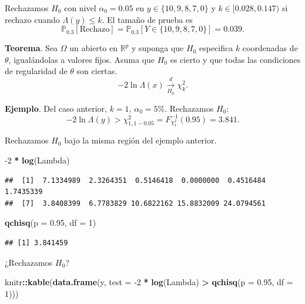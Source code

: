 \documentclass[
  12pt,
]{book}
\newenvironment{Shaded}{\begin{snugshade}}{\end{snugshade}}
\newcommand{\DataTypeTok}[1]{\textcolor[rgb]{0.13,0.29,0.53}{#1}}
\newcommand{\DecValTok}[1]{\textcolor[rgb]{0.00,0.00,0.81}{#1}}
\newcommand{\FloatTok}[1]{\textcolor[rgb]{0.00,0.00,0.81}{#1}}
\newcommand{\KeywordTok}[1]{\textcolor[rgb]{0.13,0.29,0.53}{\textbf{#1}}}
\newcommand{\NormalTok}[1]{#1}
\newcommand{\OperatorTok}[1]{\textcolor[rgb]{0.81,0.36,0.00}{\textbf{#1}}}
\newcommand{\StringTok}[1]{\textcolor[rgb]{0.31,0.60,0.02}{#1}}
\begin{document}
Rechazamos \(H_0\) con nivel \(\alpha_0 = 0.05\) en \(y \in\{10,9,8,7,0\}\) y \(k\in [0.028,0.147)\) si rechazo cuando \(\Lambda(y)\leq k\). El tamaño de prueba es
\[\mathbb P_{0.3}[\text{Rechazo}] = \mathbb{P}_{0.3}[Y\in \{10,9,8,7,0\}] = 0.039.\]

\textbf{Teorema}. Sea \(\Omega\) un abierto en \(\mathbb R^p\) y suponga que \(H_0\) especifica \(k\) coordenadas de \(\theta\), igualándolas a valores fijos. Asuma que \(H_0\) es cierto y que todas las condiciones de regularidad de \(\theta\) son ciertas.
\[-2\ln\Lambda(x)\xrightarrow[H_0]{d}\chi^2_k.\]

\textbf{Ejemplo}. Del caso anterior, \(k=1\), \(\alpha_0 = 5\%\). Rechazamos \(H_0\):
\[-2\ln \Lambda(y)>\chi^2_{1,1-0.05} = F^{-1}_{\chi^2_1}(0.95) = 3.841.\]

Rechazamos \(H_0\) bajo la misma región del ejemplo anterior.

\begin{Shaded}
\begin{Highlighting}[]
\DecValTok{{-}2} \OperatorTok{*}\StringTok{ }\KeywordTok{log}\NormalTok{(Lambda)}
\end{Highlighting}
\end{Shaded}

\begin{verbatim}
##  [1]  7.1334989  2.3264351  0.5146418  0.0000000  0.4516484  1.7435339
##  [7]  3.8408399  6.7783829 10.6822162 15.8832009 24.0794561
\end{verbatim}

\begin{Shaded}
\begin{Highlighting}[]
\KeywordTok{qchisq}\NormalTok{(}\DataTypeTok{p =} \FloatTok{0.95}\NormalTok{, }\DataTypeTok{df =} \DecValTok{1}\NormalTok{)}
\end{Highlighting}
\end{Shaded}

\begin{verbatim}
## [1] 3.841459
\end{verbatim}

¿Rechazamos \(H_0\)?

\begin{Shaded}
\begin{Highlighting}[]
\NormalTok{knitr}\OperatorTok{::}\KeywordTok{kable}\NormalTok{(}\KeywordTok{data.frame}\NormalTok{(y, }\DataTypeTok{test =} \DecValTok{{-}2} \OperatorTok{*}\StringTok{ }\KeywordTok{log}\NormalTok{(Lambda) }\OperatorTok{\textgreater{}}\StringTok{ }\KeywordTok{qchisq}\NormalTok{(}\DataTypeTok{p =} \FloatTok{0.95}\NormalTok{, }\DataTypeTok{df =} \DecValTok{1}\NormalTok{)))}
\end{Highlighting}
\end{Shaded}
\end{document}
